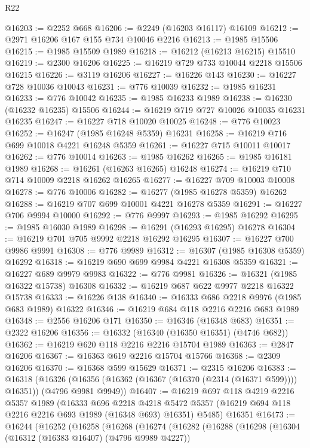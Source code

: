 \begin{lexlean}{R22}
\begin{coremodule}
@16203 := @2252 @668
@16206 := @2249 (@16203 @16117) @16109
@16212 := @2971 @16206 @167 @155 @734 @10046 @2216
@16213 := @1985 @15506
@16215 := @1985 @15509 @1989
@16218 := @16212 (@16213 @16215) @15510
@16219 := @2300 @16206
@16225 := @16219 @729 @733 @10044 @2218 @15506 @16215
@16226 := @3119 @16206
@16227 := @16226 @143
@16230 := @16227 @728 @10036 @10043
@16231 := @776 @10039
@16232 := @1985 @16231
@16233 := @776 @10042
@16235 := @1985 @16233 @1989
@16238 := @16230 (@16232 @16235) @15506
@16244 := @16219 @719 @727 @10026 @10035 @16231 @16235
@16247 := @16227 @718 @10020 @10025
@16248 := @776 @10023
@16252 := @16247 (@1985 @16248 @5359) @16231
@16258 := @16219 @716 @699 @10018 @4221 @16248 @5359
@16261 := @16227 @715 @10011 @10017
@16262 := @776 @10014
@16263 := @1985 @16262
@16265 := @1985 @16181 @1989
@16268 := @16261 (@16263 @16265) @16248
@16274 := @16219 @710 @714 @10009 @2218 @16262 @16265
@16277 := @16227 @709 @10003 @10008
@16278 := @776 @10006
@16282 := @16277 (@1985 @16278 @5359) @16262
@16288 := @16219 @707 @699 @10001 @4221 @16278 @5359
@16291 := @16227 @706 @9994 @10000
@16292 := @776 @9997
@16293 := @1985 @16292
@16295 := @1985 @16030 @1989
@16298 := @16291 (@16293 @16295) @16278
@16304 := @16219 @701 @705 @9992 @2218 @16292 @16295
@16307 := @16227 @700 @9986 @9991
@16308 := @776 @9989
@16312 := @16307 (@1985 @16308 @5359) @16292
@16318 := @16219 @690 @699 @9984 @4221 @16308 @5359
@16321 := @16227 @689 @9979 @9983
@16322 := @776 @9981
@16326 := @16321 (@1985 @16322 @15738) @16308
@16332 := @16219 @687 @622 @9977 @2218 @16322 @15738
@16333 := @16226 @138
@16340 := @16333 @686 @2218 @9976 (@1985 @683 @1989) @16322
@16346 := @16219 @684 @118 @2216 @2216 @683 @1989
@16348 := @2556 @16206 @171
@16350 := @16346 (@16348 @683)
@16351 := @2322 @16206
@16356 := @16332 (@16340 (@16350 @16351) (@4746 @682))
@16362 := @16219 @620 @118 @2216 @2216 @15704 @1989
@16363 := @2847 @16206
@16367 := @16363 @619 @2216 @15704 @15766
@16368 := @2309 @16206
@16370 := @16368 @599 @15629
@16371 := @2315 @16206
@16383 := @16318
    (@16326 (@16356 (@16362 (@16367 (@16370 (@2314 (@16371 @599)))) @16351)) (@4796 @9981 @9949))
@16407 := @16219
    @697
    @118
    @4219
    @2216
    @5357
    @1989
    (@16333
      @696
      @2218
      @4218
      @5472
      @5357
      (@16219 @694 @118 @2216 @2216 @693 @1989 (@16348 @693) @16351)
      @5485)
    @16351
@16473 := @16244
    (@16252
      (@16258
        (@16268
          (@16274
            (@16282
              (@16288
                (@16298
                  (@16304
                    (@16312 (@16383 @16407) (@4796 @9989 @4227))

\end{coremodule}
\end{lexlean}
